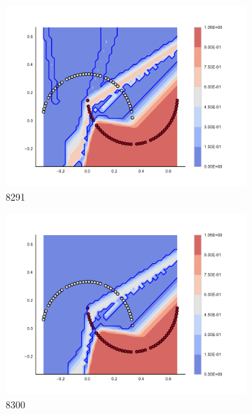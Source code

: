 \begin{figure}[h]
\begin{subfigure}[b]{0.09\textwidth}
    \includegraphics[clip, trim=2.35cm 1.75cm 4.5cm 0cm,width=\textwidth]{img/convergence/8291.pdf}
    \caption{8291}
    \label{fig:convergence_8291}
\end{subfigure}
%
\begin{subfigure}[b]{0.09\textwidth}
    \includegraphics[clip, trim=2.35cm 1.75cm 4.5cm 0cm,width=\textwidth]{img/convergence/8300.pdf}
    \caption{8300}
    \label{fig:convergence_8300}
\end{subfigure}
%
\begin{subfigure}[b]{0.09\textwidth}

\end{subfigure}
\end{figure}
